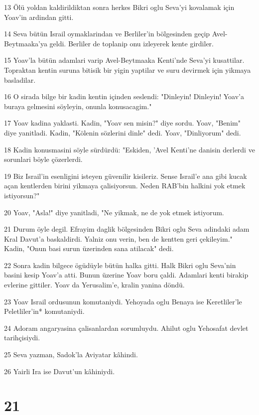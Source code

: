 \par 13 Ölü yoldan kaldirildiktan sonra herkes Bikri oglu Seva'yi kovalamak için Yoav'in ardindan gitti.
\par 14 Seva bütün Israil oymaklarindan ve Berliler'in bölgesinden geçip Avel-Beytmaaka'ya geldi. Berliler de toplanip onu izleyerek kente girdiler.
\par 15 Yoav'la bütün adamlari varip Avel-Beytmaaka Kenti'nde Seva'yi kusattilar. Topraktan kentin suruna bitisik bir yigin yaptilar ve suru devirmek için yikmaya basladilar.
\par 16 O sirada bilge bir kadin kentin içinden seslendi: "Dinleyin! Dinleyin! Yoav'a buraya gelmesini söyleyin, onunla konusacagim."
\par 17 Yoav kadina yaklasti. Kadin, "Yoav sen misin?" diye sordu. Yoav, "Benim" diye yanitladi. Kadin, "Kölenin sözlerini dinle" dedi. Yoav, "Dinliyorum" dedi.
\par 18 Kadin konusmasini söyle sürdürdü: "Eskiden, 'Avel Kenti'ne danisin derlerdi ve sorunlari böyle çözerlerdi.
\par 19 Biz Israil'in esenligini isteyen güvenilir kisileriz. Sense Israil'e ana gibi kucak açan kentlerden birini yikmaya çalisiyorsun. Neden RAB'bin halkini yok etmek istiyorsun?"
\par 20 Yoav, "Asla!" diye yanitladi, "Ne yikmak, ne de yok etmek istiyorum.
\par 21 Durum öyle degil. Efrayim daglik bölgesinden Bikri oglu Seva adindaki adam Kral Davut'a baskaldirdi. Yalniz onu verin, ben de kentten geri çekileyim." Kadin, "Onun basi surun üzerinden sana atilacak" dedi.
\par 22 Sonra kadin bilgece ögüdüyle bütün halka gitti. Halk Bikri oglu Seva'nin basini kesip Yoav'a atti. Bunun üzerine Yoav boru çaldi. Adamlari kenti birakip evlerine gittiler. Yoav da Yerusalim'e, kralin yanina döndü.
\par 23 Yoav Israil ordusunun komutaniydi. Yehoyada oglu Benaya ise Keretliler'le Peletliler'in* komutaniydi.
\par 24 Adoram angaryasina çalisanlardan sorumluydu. Ahilut oglu Yehosafat devlet tarihçisiydi.
\par 25 Seva yazman, Sadok'la Aviyatar kâhindi.
\par 26 Yairli Ira ise Davut'un kâhiniydi.

\chapter{21}

